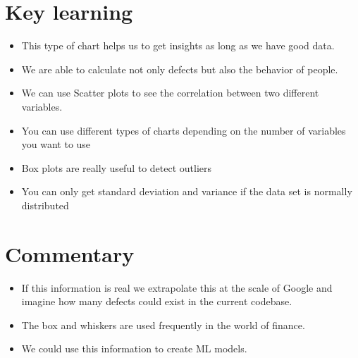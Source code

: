 \section{Key learning}
\begin{itemize}
    \item This type of chart helps us to get insights as long as we have good data.
    \item We are able to calculate not only defects but also the behavior of people.
    \item We can use Scatter plots to see the correlation between two different variables.
    \item You can use different types of charts depending on the number of variables you want to use 
    \item Box plots are really useful to detect outliers
    \item You can only get standard deviation and variance if the data set is normally distributed
\end{itemize}

\pagebreak

\section{Commentary}
\begin{itemize}
    \item If this information is real we extrapolate this at the scale of Google and imagine how many defects could exist in the current codebase.
    \item The box and whiskers are used frequently in the world of finance.
    \item We could use this information to create ML models.
\end{itemize}

